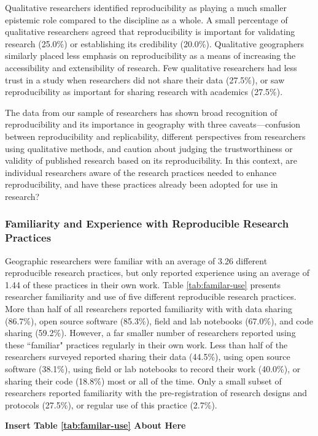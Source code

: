 \documentclass[]{interact}
\theoremstyle{plain}%
\theoremstyle{definition}
\theoremstyle{remark}
\begin{document}
Qualitative researchers identified reproducibility as playing a much smaller epistemic role compared to the discipline as a whole. 
A small percentage of qualitative researchers agreed that reproducibility is important for validating research (25.0\%) or establishing its credibility (20.0\%).
Qualitative geographers similarly placed less emphasis on reproducibility as a means of increasing the accessibility and extensibility of research.
Few qualitative researchers had less trust in a study when researchers did not share their data (27.5\%), or saw reproducibility as important for sharing research with academics (27.5\%).

The data from our sample of researchers has shown broad recognition of reproducibility and its importance in geography with three caveats---confusion between reproducibility and replicability, different perspectives from researchers using qualitative methods, and caution about judging the trustworthiness or validity of published research based on its reproducibility. 
In this context, are individual researchers aware of the research practices needed to enhance reproducibility, and have these practices already been adopted for use in research?

\subsubsection*{Familiarity and Experience with Reproducible Research Practices}
Geographic researchers were familiar with an average of 3.26 different reproducible research practices, but only reported experience using an average of 1.44 of these practices in their own work.
Table \ref{tab:familar-use} presents researcher familiarity and use of five different reproducible research practices.
More than half of all researchers reported familiarity with with data sharing (86.7\%), open source software (85.3\%), field and lab notebooks (67.0\%), and code sharing (59.2\%).
However, a far smaller number of researchers reported using these ``familiar" practices regularly in their own work. 
Less than half of the researchers surveyed reported sharing their data (44.5\%), using open source software (38.1\%), using field or lab notebooks to record their work (40.0\%), or sharing their code (18.8\%) most or all of the time. 
Only a small subset of researchers reported familiarity with the pre-registration of research designs and protocols (27.5\%), or regular use of this practice (2.7\%).

\begin{center}
\textbf{Insert Table \ref{tab:familar-use} About Here}
\end{center}
\end{document}
